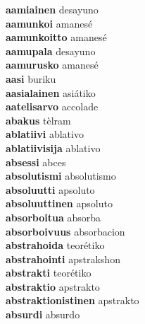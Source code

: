 \textbf{aamiainen } desayuno \\
\textbf{aamunkoi } amanesé \\
\textbf{aamunkoitto } amanesé \\
\textbf{aamupala } desayuno \\
\textbf{aamurusko } amanesé \\
\textbf{aasi } buriku \\
\textbf{aasialainen } asiátiko \\
\textbf{aatelisarvo } accolade \\
\textbf{abakus } tèlram \\
\textbf{ablatiivi } ablativo \\
\textbf{ablatiivisija } ablativo \\
\textbf{absessi } abces \\
\textbf{absolutismi } absolutismo \\
\textbf{absoluutti } apsoluto \\
\textbf{absoluuttinen } apsoluto \\
\textbf{absorboitua } absorba \\
\textbf{absorboivuus } absorbacion \\
\textbf{abstrahoida } teorétiko \\
\textbf{abstrahointi } apstrakshon \\
\textbf{abstrakti } teorétiko \\
\textbf{abstraktio } apstrakto \\
\textbf{abstraktionistinen } apstrakto \\
\textbf{absurdi } absurdo \\
